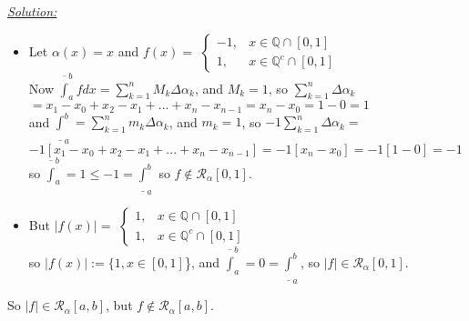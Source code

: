 \documentclass{book}
\begin{document}
\begin{tcolorbox}[enhanced,attach boxed title to top center={yshift=-3mm,yshifttext=-1mm},
colback=blue!5!white,colframe=blue!75!black,colbacktitle=red!80!black,
title=Exercise 51.18:,fonttitle=\bfseries,
boxed title style={size=small,colframe=red!50!black} ]
\textit{\color{blue}\underline{Solution:}}
\begin{itemize}
\item Let $\alpha(x)=x$ and $f(x)=$
$\begin{cases}
-1,& x\in\mathbb{Q}\cap[0,1]\\
1,& x\in\mathbb{Q}^c\cap[0,1]
\end{cases}$\\
Now $\overline{\int}_a^b f dx=\sum_{k=1}^n M_k\Delta\alpha_k$, and $M_k=1$, so $\sum_{k=1}^n\Delta\alpha_k$\\
$=x_1-x_0+x_2-x_1+...+x_n-x_{n-1}=x_n-x_0=1-0=1$\\
and $\underline{\int}_a^b=\sum_{k=1}^n m_k\Delta\alpha_k$, and $m_k=1$, so
$-1\sum_{k=1}^n\Delta\alpha_k=$\\
$-1[x_1-x_0+x_2-x_1+...+x_n-x_{n-1}]=-1[x_n-x_0]=-1[1-0]=-1$\\
so $\overline{\int}_a^b=1\leq -1=\underline{\int}_a^b$ so $f\notin\mathscr{R}_\alpha[0,1].$
\item But $|f(x)|=$
$\begin{cases}
1, & x\in\mathbb{Q}\cap[0,1]\\
1,& x\in\mathbb{Q}^c\cap[0,1]
\end{cases}$\\
so $|f(x)|:=\{1, x\in[0,1]$\}, and $\overline{\int}_a^b=0=\underline{\int}_a^b$, so $|f|\in\mathscr{R}_\alpha[0,1].$
\end{itemize}
\begin{tcolorbox}[colback=blue!5!white,colframe=blue!75!black]
\begin{center}
So $|f|\in\mathscr{R}_\alpha[a,b]$, but $f\notin\mathscr{R}_\alpha[a,b].$
\end{center}

\end{tcolorbox}
\end{tcolorbox}
\end{document}
